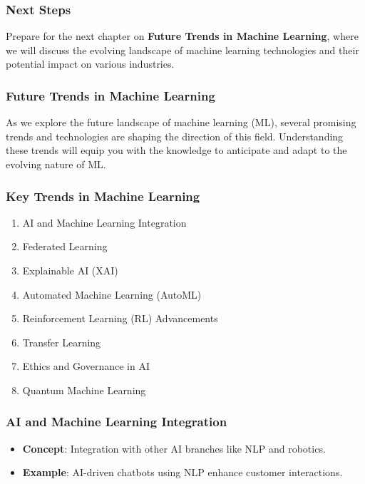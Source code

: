\documentclass[aspectratio=169]{beamer}
\begin{document}
\begin{frame}
    \frametitle{Next Steps}
    Prepare for the next chapter on \textbf{Future Trends in Machine Learning}, where we will discuss the evolving landscape of machine learning technologies and their potential impact on various industries.
\end{frame}

\begin{frame}[fragile]
    \frametitle{Future Trends in Machine Learning}
    As we explore the future landscape of machine learning (ML), several promising trends and technologies are shaping the direction of this field. 
    Understanding these trends will equip you with the knowledge to anticipate and adapt to the evolving nature of ML.
\end{frame}

\begin{frame}[fragile]
    \frametitle{Key Trends in Machine Learning}
    \begin{enumerate}
        \item AI and Machine Learning Integration
        \item Federated Learning
        \item Explainable AI (XAI)
        \item Automated Machine Learning (AutoML)
        \item Reinforcement Learning (RL) Advancements
        \item Transfer Learning
        \item Ethics and Governance in AI
        \item Quantum Machine Learning
    \end{enumerate}
\end{frame}

\begin{frame}[fragile]
    \frametitle{AI and Machine Learning Integration}
    \begin{itemize}
        \item \textbf{Concept}: Integration with other AI branches like NLP and robotics.
        \item \textbf{Example}: AI-driven chatbots using NLP enhance customer interactions.
    \end{itemize}
\end{frame}
\end{document}
